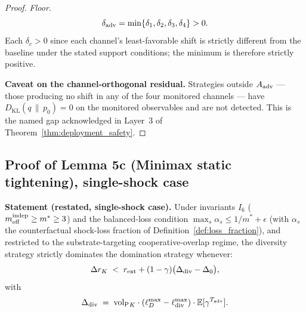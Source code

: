 \begin{proof}
\emph{Floor.}
\[
  \delta_{\mathrm{adv}} = \min\{\delta_1, \delta_2, \delta_3, \delta_4\} > 0.
\]
Each $\delta_c > 0$ since each channel's least-favorable shift is
strictly different from the baseline under the stated support
conditions; the minimum is therefore strictly positive.

\textbf{Caveat on the channel-orthogonal residual.}
Strategies outside $A_{\mathrm{adv}}$ --- those producing no shift in any of
the four monitored channels --- have $D_{\mathrm{KL}}(q \,\|\, p_0)
= 0$ on the monitored observables and are not detected.  This is
the named gap acknowledged in Layer~3 of
Theorem~\ref{thm:deployment_safety}.
\end{proof}

\subsection{Proof of Lemma 5c (Minimax static tightening), single-shock case}
\label{app:proof_lem5c}

\textbf{Statement (restated, single-shock case).}  Under invariants
$I_6$ ($m_{\mathrm{eff}}^{\mathrm{indep}} \geq m^* \geq 3$) and the balanced-loss condition
$\max_s \alpha_s \leq 1/m^* + \epsilon$ (with $\alpha_s$ the
counterfactual shock-loss fraction of
Definition~\ref{def:loss_fraction}), and restricted to the
substrate-targeting cooperative-overlap regime, the diversity
strategy strictly dominates the domination strategy whenever:
\[
  \Delta r_K \;<\; r_{\mathrm{ext}} + (1 - \gamma)\bigl(\Delta_{\mathrm{div}} - \Delta_0\bigr),
\]
with
\[
  \Delta_{\mathrm{div}} \;=\; {\operatorname{vol}_{\mathrm{P}}}_K \cdot (\ell_D^{\max} - \ell_{\mathrm{div}}^{\max}) \cdot
  \mathbb{E}[\gamma^{T_{\mathrm{adv}}}].
\]

